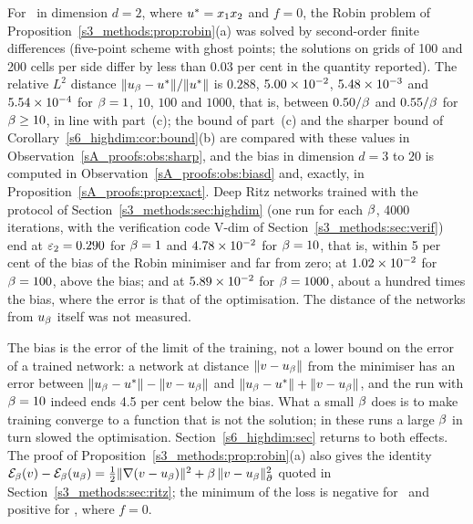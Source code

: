 \begin{observation}[Size of the penalty bias for \Pone\ at $d=2$]\label{s3_methods:obs:robin}
For \Pone\ in dimension $d=2$, where $u^{*}=x_1x_2$ and $f=0$, the Robin problem of
Proposition~\ref{s3_methods:prop:robin}(a) was solved by second-order finite differences
(five-point scheme with ghost points; the solutions on grids of 100 and 200 cells per
side differ by less than 0.03 per cent in the quantity reported). The relative $L^2$
distance $\lVert u_{\beta}-u^{*}\rVert/\lVert u^{*}\rVert$ is $0.288$, $5.00\times 10^{-2}$,
$5.48\times 10^{-3}$ and $5.54\times 10^{-4}$ for $\beta=1$, $10$, $100$ and $1000$, that is,
between $0.50/\beta$ and $0.55/\beta$ for $\beta\ge10$, in line with part~(c); the bound of
part~(c) and the sharper bound of Corollary~\ref{s6_highdim:cor:bound}(b) are compared with these
values in Observation~\ref{sA_proofs:obs:sharp}, and the bias in dimension $d=3$ to $20$ is computed
in Observation~\ref{sA_proofs:obs:biasd} and, exactly, in Proposition~\ref{sA_proofs:prop:exact}.
Deep Ritz networks trained with the protocol of Section~\ref{s3_methods:sec:highdim} (one
run for each $\beta$, 4000 iterations, with the verification code \textsf{V-dim} of
Section~\ref{s3_methods:sec:verif}) end at $\varepsilon_{2}=0.290$ for $\beta=1$ and
$4.78\times 10^{-2}$ for $\beta=10$, that is, within 5 per cent of the bias of the Robin
minimiser and far from zero; at $1.02\times 10^{-2}$ for $\beta=100$, above the bias; and at
$5.89\times 10^{-2}$ for $\beta=1000$, about a hundred times the bias, where the error is that
of the optimisation. The distance of the networks from $u_{\beta}$ itself was not measured.
\end{observation}

\noindent The bias is the error of the limit of the training, not a lower bound on the
error of a trained network: a network at distance $\lVert v-u_{\beta}\rVert$ from the minimiser has
an error between $\lVert u_{\beta}-u^{*}\rVert-\lVert v-u_{\beta}\rVert$ and
$\lVert u_{\beta}-u^{*}\rVert+\lVert v-u_{\beta}\rVert$, and the run with $\beta=10$ indeed ends 4.5 per cent
below the bias. What a small $\beta$ does is to make training converge to a function that is
not the solution; in these runs a large $\beta$ in turn slowed the optimisation.
Section~\ref{s6_highdim:sec} returns to both effects. The proof of
Proposition~\ref{s3_methods:prop:robin}(a) also gives the identity
$\mathcal{E}_{\beta}(v)-\mathcal{E}_{\beta}(u_{\beta})=\tfrac12\lVert \nabla(v-u_{\beta})\rVert^2+\beta\,\lVert v-u_{\beta}\rVert_{\partial}^2$ quoted in
Section~\ref{s3_methods:sec:ritz}; the minimum of the loss is negative for \Ptwo\ and positive
for \Pone, where $f=0$.

